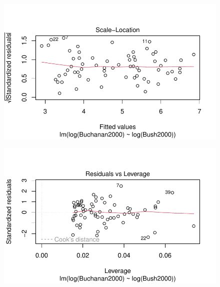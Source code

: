 \documentclass[
  letterpaper,
  DIV=11,
  numbers=noendperiod]{scrartcl}
\begin{document}
\begin{figure}[H]

{\centering \includegraphics{case_study_1_files/figure-pdf/unnamed-chunk-6-16.pdf}

}

\end{figure}

\begin{figure}[H]

{\centering \includegraphics{case_study_1_files/figure-pdf/unnamed-chunk-6-17.pdf}

}

\end{figure}
\end{document}
